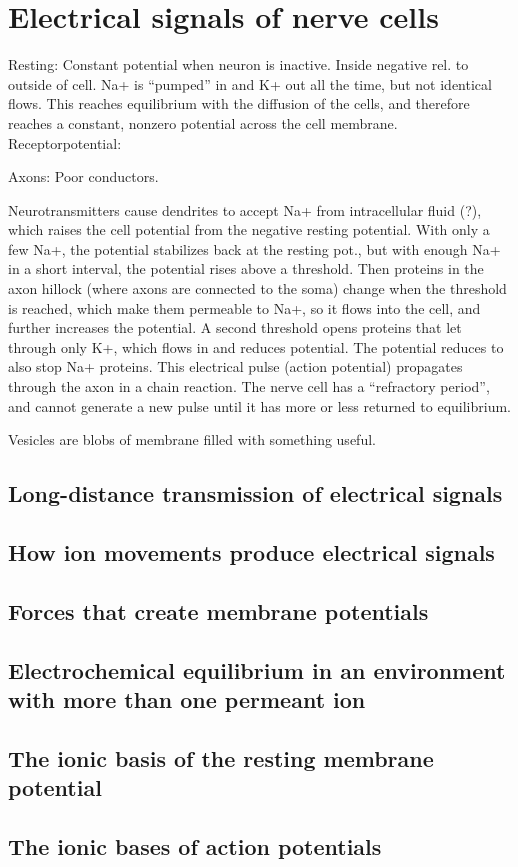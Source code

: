\section{Electrical signals of nerve cells}

Resting: Constant potential when neuron is inactive. Inside negative rel. to outside of cell. Na+ is ``pumped'' in and K+ out all the time, but not identical flows. This reaches equilibrium with the diffusion of the cells, and therefore reaches a constant, nonzero potential across the cell membrane.
Receptorpotential:

Axons: Poor conductors.

Neurotransmitters cause dendrites to accept Na+ from intracellular fluid (?), which raises the cell potential from the negative resting potential. With only a few Na+, the potential stabilizes back at the resting pot., but with enough Na+ in a short interval, the potential rises above a threshold. Then proteins in the axon hillock (where axons are connected to the soma) change when the threshold is reached, which make them permeable to Na+, so it flows into the cell, and further increases the potential. A second threshold opens proteins that let through only K+, which flows in and reduces potential. The potential reduces to also stop Na+ proteins. This electrical pulse (action potential) propagates through the axon in a chain reaction. The nerve cell has a ``refractory period'', and cannot generate a new pulse until it has more or less returned to equilibrium.

Vesicles are blobs of membrane filled with something useful.


\subsection{Long-distance transmission of electrical signals}

\subsection{How ion movements produce electrical signals}

\subsection{Forces that create membrane potentials}

\subsection{Electrochemical equilibrium in an environment with more than one permeant ion}

\subsection{The ionic basis of the resting membrane potential}

\subsection{The ionic bases of action potentials}

